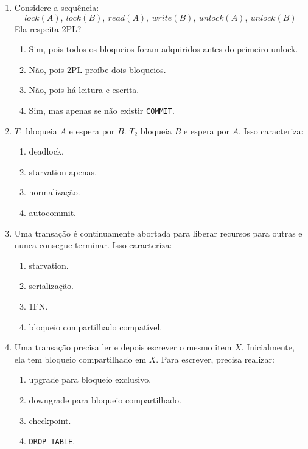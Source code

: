 \documentclass[12pt,a4paper]{article}
\begin{document}
\begin{enumerate}[resume,label=\textbf{Q\arabic*.}]
\item Considere a sequência:
\[
lock(A),\ lock(B),\ read(A),\ write(B),\ unlock(A),\ unlock(B)
\]
Ela respeita 2PL?

\begin{enumerate}[label=\alph*)]
    \item Sim, pois todos os bloqueios foram adquiridos antes do primeiro unlock.
    \item Não, pois 2PL proíbe dois bloqueios.
    \item Não, pois há leitura e escrita.
    \item Sim, mas apenas se não existir \texttt{COMMIT}.
\end{enumerate}

\item $T_1$ bloqueia $A$ e espera por $B$. $T_2$ bloqueia $B$ e espera por $A$. Isso caracteriza:

\begin{enumerate}[label=\alph*)]
    \item deadlock.
    \item starvation apenas.
    \item normalização.
    \item autocommit.
\end{enumerate}

\item Uma transação é continuamente abortada para liberar recursos para outras e nunca consegue terminar. Isso caracteriza:

\begin{enumerate}[label=\alph*)]
    \item starvation.
    \item serialização.
    \item 1FN.
    \item bloqueio compartilhado compatível.
\end{enumerate}

\item Uma transação precisa ler e depois escrever o mesmo item $X$. Inicialmente, ela tem bloqueio compartilhado em $X$. Para escrever, precisa realizar:

\begin{enumerate}[label=\alph*)]
    \item upgrade para bloqueio exclusivo.
    \item downgrade para bloqueio compartilhado.
    \item checkpoint.
    \item \texttt{DROP TABLE}.
\end{enumerate}


\end{enumerate}
\end{document}

